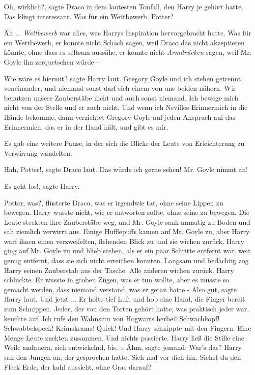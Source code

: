 \glqq{}Oh, wirklich?\grqq{}, sagte Draco in dem lautesten Tonfall, den Harry je
gehört hatte. \glqq{}Das klingt interessant. Was für ein Wettbewerb,
Potter?\grqq{}

Äh ... \glqq{}\emph{Wettbewerb}\grqq{} war alles, was Harrys Inspiration
hervorgebracht hatte. Was für ein Wettbewerb, er konnte nicht \glqq{}
Schach\grqq{} sagen, weil Draco das nicht akzeptieren könnte, ohne dass es
seltsam aussähe, er konnte nicht \glqq{}\emph{Armdrücken}\grqq{} sagen, weil Mr.
Goyle ihn zerquetschen würde -

\glqq{}Wie wäre es hiermit?\grqq{} sagte Harry laut. \glqq{}Gregory Goyle und ich
stehen getrennt voneinander, und niemand sonst darf sich einem von uns beiden
nähern. Wir benutzen unsere Zauberstäbe nicht und auch sonst niemand. Ich bewege
mich nicht von der Stelle und er auch nicht. Und wenn ich Nevilles Erinnermich
in die Hände bekomme, dann verzichtet Gregory Goyle auf jeden Anspruch auf das
Erinnermich, das er in der Hand hält, und gibt es mir.\grqq{}

Es gab eine weitere Pause, in der sich die Blicke der Leute von Erleichterung zu
Verwirrung wandelten.

\glqq{}Hah, Potter!\grqq{}, sagte Draco laut. \glqq{}Das würde ich gerne sehen!
Mr. Goyle nimmt an!\grqq{}

\glqq{}Es geht los!\grqq{}, sagte Harry.

\glqq{}Potter, was?\grqq{}, flüsterte Draco, was er irgendwie tat, ohne seine
Lippen zu bewegen. Harry wusste nicht, wie er antworten sollte, ohne seine zu
bewegen. Die Leute steckten ihre Zauberstäbe weg, und Mr. Goyle sank anmutig zu
Boden und sah ziemlich verwirrt aus. Einige Hufflepuffs kamen auf Mr. Goyle zu,
aber Harry warf ihnen einen verzweifelten, flehenden Blick zu und sie wichen
zurück. Harry ging auf Mr. Goyle zu und blieb stehen, als er ein paar Schritte
entfernt war, weit genug entfernt, dass sie sich nicht erreichen konnten.
Langsam und bedächtig zog Harry seinen Zauberstab aus der Tasche. Alle anderen
wichen zurück. Harry schluckte. Er wusste in groben Zügen, was er tun wollte,
aber es musste so gemacht werden, dass niemand verstand, was er getan hatte -
\glqq{}Also gut\grqq{}, sagte Harry laut. \glqq{}Und jetzt ...\grqq{} Er holte
tief Luft und hob eine Hand, die Finger bereit zum Schnippen. Jeder, der von den
Torten gehört hatte, was praktisch jeder war, keuchte auf. \glqq{}Ich rufe den
Wahnsinn von Hogwarts herbei! Schwachkopf! Schwabbelspeck! Krimskrams!
Quiek!\grqq{} Und Harry schnippte mit den Fingern. Eine Menge Leute zuckten
zusammen. Und nichts passierte. Harry ließ die Stille eine Weile andauern, sich
entwickelnd, bis. .. \glqq{}Ähm\grqq{}, sagte jemand. \glqq{}War's das?\grqq{}
Harry sah den Jungen an, der gesprochen hatte. \glqq{}Sieh mal vor dich hin.
Siehst du den Fleck Erde, der kahl aussieht, ohne Gras darauf?\grqq{}

